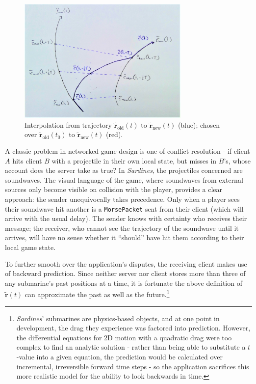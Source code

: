 \documentclass[a4paper, 10pt]{article}
\begin{document}
\begin{flushleft}
\begin{figure}[h]
\centering
\includegraphics[width=0.75\textwidth]{Interpolation}
\caption{Interpolation from trajectory $\mathbf{\tilde{r}}_{\textrm{old}}(t)$ to $\mathbf{\tilde{r}}_{\textrm{new}}(t)$ (blue); chosen over $\mathbf{\tilde{r}}_{\textrm{old}}(t_0)$ to $\mathbf{\tilde{r}}_{\textrm{new}}(t)$ (red).}
\label{Interpolation}
\end{figure}

\vspace{5pt}\noindent
A classic problem in networked game design is one of conflict resolution - if client $A$ hits client $B$ with a projectile in their own local state, but misses in $B$'s, whose account does the server take as true? In \textit{Sardines}, the projectiles concerned are soundwaves. The visual language of the game, where soundwaves from external sources only become visible on collision with the player, provides a clear approach: the sender unequivocally takes precedence. Only when a player sees their soundwave hit another is a \texttt{MorsePacket} sent from their client (which will arrive with the usual delay). The sender knows with certainty who receives their message; the receiver, who cannot see the trajectory of the soundwave until it arrives, will have no sense whether it ``should'' have hit them according to their local game state.

\vspace{5pt}\noindent
To further smooth over the application's disputes, the receiving client makes use of backward prediction. Since neither server nor client stores more than three of any submarine's past positions at a time, it is fortunate the above definition of $\mathbf{\tilde{r}}(t)$ can approximate the past as well as the future.\footnote{\textit{Sardines}' submarines are physics-based objects, and at one point in development, the drag they experience was factored into prediction. However, the differential equations for 2D motion with a quadratic drag were too complex to find an analytic solution - rather than being able to substitute a $t$-value into a given equation, the prediction would be calculated over incremental, irreversible forward time steps - so the application sacrifices this more realistic model for the ability to look backwards in time.}


\end{flushleft}
\end{document}
